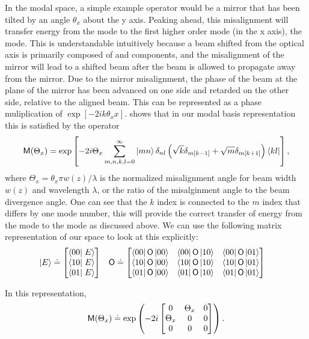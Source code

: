 In the modal space, a simple example operator would be a mirror that has been tilted by an angle $\theta_x$ about the y axis. %
Peaking ahead, this misalignment will transfer energy from the  mode to the first higher order mode (in the x axis), the  mode. %
This is understandable intuitively because a  beam shifted from the optical axis is primarily composed of  and  components, and the misalignment of the mirror will lead to a shifted beam after the beam is allowed to propagate away from the mirror. %
Due to the mirror misalignment, the phase of the beam at the plane of the mirror has been advanced on one side and retarded on the other side, relative to the aligned beam. %
This can be represented as a phase muliplication of $\exp[-2ik\theta_x x]$. %
\citet{Hefetz:97} shows that in our modal basis representation this is satisfied by the operator
\begin{equation}
\mathsf{M}(\Theta_x) = \exp\left[ -2i\Theta_x\sum_{m,n,k,l=0}^\infty \left| mn \right> \delta_{nl} \left( \sqrt k \delta_{m[k-1]}+\sqrt m \delta_{m[k+1]} \right) \left< kl \right|\right],
\end{equation}
where $\Theta_x = \theta_x \pi w(z)/\lambda$ is the normalized misalignment angle for beam width $w(z)$ and wavelength $\lambda$, or the ratio of the misalginment angle to the beam divergence angle. %
One can see that the $k$ index is connected to the $m$ index that differs by one mode number, this will provide the correct transfer of energy from the  mode to the  mode as discussed above. %
We can use the following matrix representation of our space to look at this explicitly:
\begin{align}
\vect{E} &\doteq \ms \inprod{00}{E} \\ \inprod{10}{E} \\ \inprod{01}{E} \me
& \oper{O} &\doteq \ms 
\matrixel{00}{\oper{O}}{00} & \matrixel{00}{\oper{O}}{10} & \matrixel{00}{\oper{O}}{01} \\
\matrixel{10}{\oper{O}}{00} & \matrixel{10}{\oper{O}}{10} & \matrixel{10}{\oper{O}}{01} \\
\matrixel{01}{\oper{O}}{00} & \matrixel{01}{\oper{O}}{10} & \matrixel{01}{\oper{O}}{01} \me
\end{align}

In this representation, 
\[
\mathsf{M}(\Theta_x) \doteq \exp \left( -2i 
\left[\begin{matrix} 
0 & \Theta_x & 0 \\
\Theta_x & 0 & 0 \\
0 & 0 & 0 
\end{matrix}\right]
\right).
\]